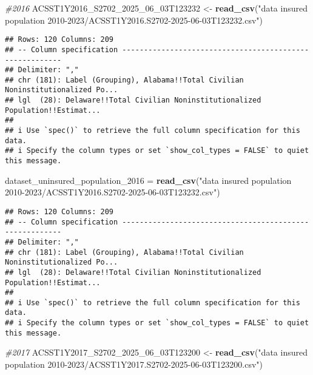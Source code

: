 \documentclass[
]{article}
\newenvironment{Shaded}{\begin{snugshade}}{\end{snugshade}}
\newcommand{\CommentTok}[1]{\textcolor[rgb]{0.56,0.35,0.01}{\textit{#1}}}
\newcommand{\FunctionTok}[1]{\textcolor[rgb]{0.13,0.29,0.53}{\textbf{#1}}}
\newcommand{\NormalTok}[1]{#1}
\newcommand{\OtherTok}[1]{\textcolor[rgb]{0.56,0.35,0.01}{#1}}
\newcommand{\StringTok}[1]{\textcolor[rgb]{0.31,0.60,0.02}{#1}}
\begin{document}
\begin{Shaded}
\begin{Highlighting}[]
\CommentTok{\#2016}
\NormalTok{ACSST1Y2016\_S2702\_2025\_06\_03T123232 }\OtherTok{\textless{}{-}} \FunctionTok{read\_csv}\NormalTok{(}\StringTok{"data insured population 2010{-}2023/ACSST1Y2016.S2702{-}2025{-}06{-}03T123232.csv"}\NormalTok{)}
\end{Highlighting}
\end{Shaded}

\begin{verbatim}
## Rows: 120 Columns: 209
## -- Column specification --------------------------------------------------------
## Delimiter: ","
## chr (181): Label (Grouping), Alabama!!Total Civilian Noninstitutionalized Po...
## lgl  (28): Delaware!!Total Civilian Noninstitutionalized Population!!Estimat...
## 
## i Use `spec()` to retrieve the full column specification for this data.
## i Specify the column types or set `show_col_types = FALSE` to quiet this message.
\end{verbatim}

\begin{Shaded}
\begin{Highlighting}[]
\NormalTok{dataset\_uninsured\_population\_2016 }\OtherTok{=} \FunctionTok{read\_csv}\NormalTok{(}\StringTok{"data insured population 2010{-}2023/ACSST1Y2016.S2702{-}2025{-}06{-}03T123232.csv"}\NormalTok{)}
\end{Highlighting}
\end{Shaded}

\begin{verbatim}
## Rows: 120 Columns: 209
## -- Column specification --------------------------------------------------------
## Delimiter: ","
## chr (181): Label (Grouping), Alabama!!Total Civilian Noninstitutionalized Po...
## lgl  (28): Delaware!!Total Civilian Noninstitutionalized Population!!Estimat...
## 
## i Use `spec()` to retrieve the full column specification for this data.
## i Specify the column types or set `show_col_types = FALSE` to quiet this message.
\end{verbatim}

\begin{Shaded}
\begin{Highlighting}[]
\CommentTok{\#2017}
\NormalTok{ACSST1Y2017\_S2702\_2025\_06\_03T123200 }\OtherTok{\textless{}{-}} \FunctionTok{read\_csv}\NormalTok{(}\StringTok{"data insured population 2010{-}2023/ACSST1Y2017.S2702{-}2025{-}06{-}03T123200.csv"}\NormalTok{)}
\end{Highlighting}
\end{Shaded}
\end{document}

